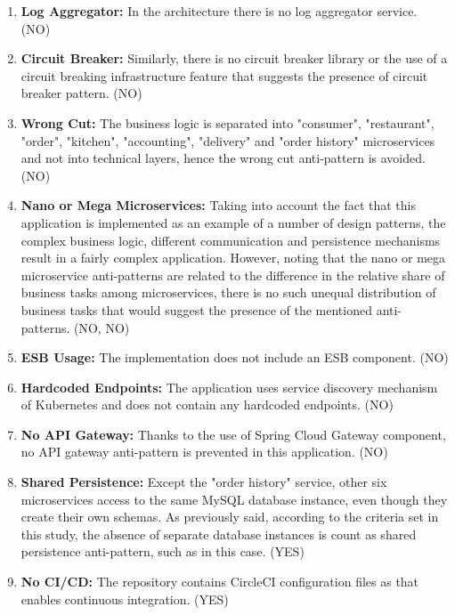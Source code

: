 \documentclass{Configuration_Files/PoliMi3i_thesis}
\begin{document}
\begin{enumerate}
    \item \textbf{Log Aggregator:} In the architecture there is no log aggregator service. (NO)
    
    \item \textbf{Circuit Breaker:} Similarly, there is no circuit breaker library or the use of a circuit breaking infrastructure feature that suggests the presence of circuit breaker pattern. (NO)
    
    \item \textbf{Wrong Cut:} The business logic is separated into "consumer", "restaurant", "order", "kitchen", "accounting", "delivery" and "order history" microservices and not into technical layers, hence the wrong cut anti-pattern is avoided. (NO)
    
    \item \textbf{Nano or Mega Microservices:} Taking into account the fact that this application is implemented as an example of a number of design patterns, the complex business logic, different communication and persistence mechanisms result in a fairly complex application.
    However, noting that the nano or mega microservice anti-patterns are related to the difference in the relative share of business tasks among microservices, there is no such unequal distribution of business tasks that would suggest the presence of the mentioned anti-patterns. (NO, NO)
    
    \item \textbf{ESB Usage:} The implementation does not include an ESB component. (NO)
    
    \item \textbf{Hardcoded Endpoints:} The application uses service discovery mechanism of Kubernetes and does not contain any hardcoded endpoints. (NO)
    
    \item \textbf{No API Gateway:} Thanks to the use of Spring Cloud Gateway component, no API gateway anti-pattern is prevented in this application. (NO)
    
    \item \textbf{Shared Persistence:} Except the "order history" service, other six microservices access to the same MySQL database instance, even though they create their own schemas.
    As previously said, according to the criteria set in this study, the absence of separate database instances is count as shared persistence anti-pattern, such as in this case. (YES)
    
    \item \textbf{No CI/CD:} The repository contains CircleCI configuration files as that enables continuous integration. (YES)
    

\end{enumerate}
\end{document}
